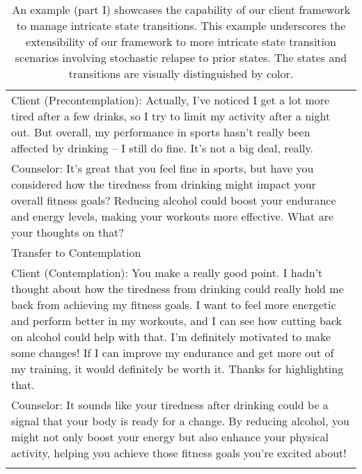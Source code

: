 \begin{table*}[htbp]
\begin{tabularx}{\textwidth}{X}
Client {\color{green}(Precontemplation)}: Actually, I've noticed I get a lot more tired after a few drinks, so I try to limit my activity after a night out. But overall, my performance in sports hasn't really been affected by drinking – I still do fine. It's not a big deal, really. \\
Counselor: It’s great that you feel fine in sports, but have you considered how the tiredness from drinking might impact your overall fitness goals? Reducing alcohol could boost your endurance and energy levels, making your workouts more effective. What are your thoughts on that? \\
{\color{blue} Transfer to Contemplation} \\
Client {\color{red} (Contemplation)}: You make a really good point. I hadn't thought about how the tiredness from drinking could really hold me back from achieving my fitness goals. I want to feel more energetic and perform better in my workouts, and I can see how cutting back on alcohol could help with that. I'm definitely motivated to make some changes! If I can improve my endurance and get more out of my training, it would definitely be worth it. Thanks for highlighting that. \\
Counselor: It sounds like your tiredness after drinking could be a signal that your body is ready for a change. By reducing alcohol, you might not only boost your energy but also enhance your physical activity, helping you achieve those fitness goals you’re excited about! \\                                                                                                \\ \bottomrule    
\end{tabularx}
\caption{An example (part I) showcases the capability of our client framework to manage intricate state transitions. This example underscores the extensibility of our framework to more intricate state transition scenarios involving stochastic relapse to prior states. The states and transitions are visually distinguished by color.}
\label{tab:complex transition1}
\end{table*}

